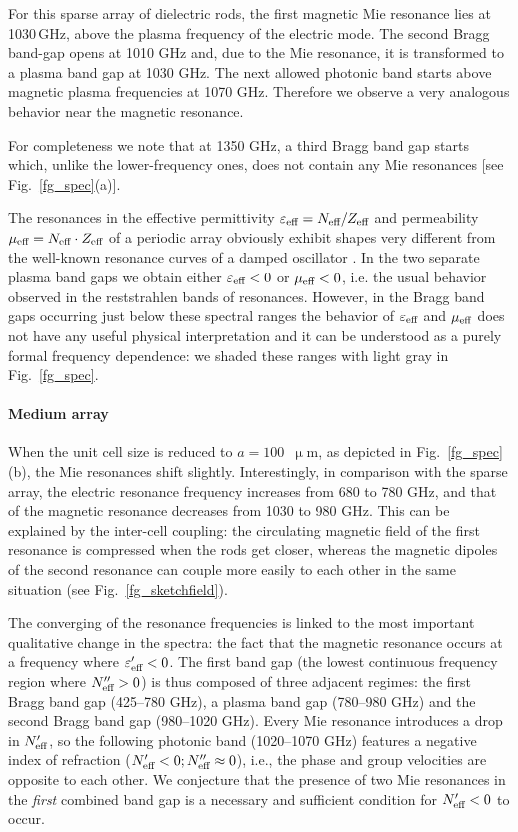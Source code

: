 For this sparse array of dielectric rods, the first magnetic Mie resonance lies at 1030\,GHz, above the plasma frequency of the electric mode.  The second Bragg band-gap opens at 1010 GHz and, due to the Mie resonance, it is transformed to a plasma band gap at 1030 GHz. The next allowed photonic band starts above magnetic plasma frequencies at 1070 GHz. Therefore we observe a very analogous behavior near the magnetic resonance. 

For completeness we note that at 1350 GHz, a third Bragg band gap starts which, unlike the lower-frequency ones, does not contain any Mie resonances [see Fig.\ \ref{fg_spec}(a)].

The resonances in the effective permittivity $\varepsilon_{\text{eff} }=N_{\text{eff} }/Z_{\text{eff} }$ and permeability $\mu_{\text{eff} } = N_{\text{eff} }\cdot Z_{\text{eff} }$ of a periodic array obviously exhibit shapes very different from the well-known resonance curves of a damped oscillator \cite{koschny2003resonant}. In the two separate plasma band gaps we obtain either $\varepsilon_{\text{eff} } < 0$ or $\mu_{\text{eff} }<0$, i.e. the usual behavior observed in the reststrahlen bands of resonances. However, in the Bragg band gaps occurring just below these spectral ranges the behavior of $\varepsilon_{\text{eff} }$ and $\mu_{\text{eff} }$ does not have any useful physical interpretation and it can be understood as a purely formal frequency dependence: we shaded these ranges with light gray in Fig.~\ref{fg_spec}.
\paragraph{Medium array}%
When the unit cell size is reduced to $a=100$~$\upmu$m, as depicted in Fig.~\ref{fg_spec}(b), the Mie resonances shift slightly. Interestingly, in comparison with the sparse array, the electric resonance frequency increases from 680 to 780 GHz, and that of the magnetic resonance decreases from 1030 to 980 GHz. This can be explained by the inter-cell coupling: the circulating magnetic field of the first resonance is compressed when the rods get closer, whereas the magnetic dipoles of the second resonance can couple more easily to each other in the same situation (see Fig.~\ref{fg_sketchfield}).

The converging of the resonance frequencies is linked to the most important qualitative change in the spectra: the fact that the magnetic resonance occurs at a frequency where $\varepsilon_{\text{eff} }'<0$. The first band gap (the lowest continuous frequency region where $N_{\text{eff} }''>0$) is thus composed of three adjacent regimes: the first Bragg band gap (425--780 GHz), a plasma band gap (780--980 GHz) and the second Bragg band gap (980--1020 GHz). Every Mie resonance introduces a drop in $N_{\text{eff} }'$, so the following photonic band (1020--1070 GHz) features a negative index of refraction ($N_{\text{eff} }'<0; N_{\text{eff} }''\approx 0$), i.e., the phase and group velocities are opposite to each other. We conjecture that the presence of two Mie resonances in the \textit{first} combined band gap is a necessary and sufficient condition for $N_{\text{eff} }'<0$ to occur.

